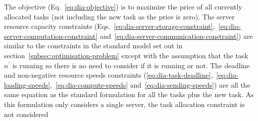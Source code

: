 The objective (Eq.~\eqref{eq:dia-objective}) is to maximize the price of all currently allocated tasks (not including
the new task as the price is zero). The server resource capacity constraints
(Eqs.~\eqref{eq:dia-server-storage-constraint},~\eqref{eq:dia-server-computation-constraint}
and~\eqref{eq:dia-server-communication-constraint}) are similar to the constraints in the standard model set out in
section~\ref{subsec:optimisation-problem} except with the assumption that the task $n^{'}$ is running so there is no
need to consider if it is running or not. The deadline and non-negative resource speeds constraints
(\ref{eq:dia-task-deadline},~\ref{eq:dia-loading-speeds},~\ref{eq:dia-compute-speeds} and~\ref{eq:dia-sending-speeds})
are all the same equation as the standard formulation for all the tasks plus the new task. As this formulation only
considers a single server, the task allocation constraint is not considered


